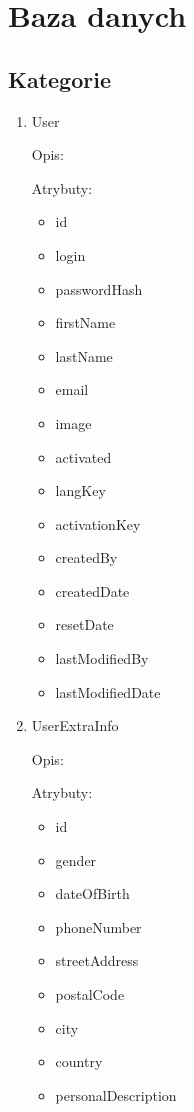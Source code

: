 \section{Baza danych}

\subsection{Kategorie}

\begin{enumerate}[label={\textbf{KAT/\protect\threedigits{\theenumi}}}, wide, labelwidth=!, labelindent=0pt]
    \setlength\itemsep{1em}
    \item User\label{kat:user}

    Opis: \lipsum[1]
    \par
    Atrybuty:
    \begin{itemize}
        \item id
        \item login
        \item passwordHash
        \item firstName
        \item lastName
        \item email
        \item image
        \item activated
        \item langKey
        \item activationKey
        \item createdBy
        \item createdDate
        \item resetDate
        \item lastModifiedBy
        \item lastModifiedDate
    \end{itemize}

    \item \label{kat:UserExtraInfo} UserExtraInfo

    Opis: \lipsum[1]
    \par
    Atrybuty:
    \begin{itemize}
        \item id
        \item gender
        \item dateOfBirth
        \item phoneNumber
        \item streetAddress
        \item postalCode
        \item city
        \item country
        \item personalDescription
    \end{itemize}


\end{enumerate}
